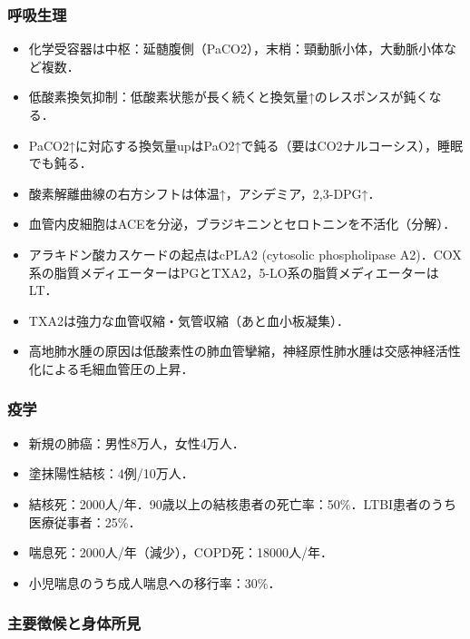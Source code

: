 \subsubsection{呼吸生理}

\begin{itemize}
\item 化学受容器は中枢：延髄腹側（PaCO2），末梢：頸動脈小体，大動脈小体など複数．
\item 低酸素換気抑制：低酸素状態が長く続くと換気量↑のレスポンスが鈍くなる．
\item PaCO2↑に対応する換気量upはPaO2↑で鈍る（要はCO2ナルコーシス），睡眠でも鈍る．
\item 酸素解離曲線の右方シフトは体温↑，アシデミア，2,3-DPG↑．
\item 血管内皮細胞はACEを分泌，ブラジキニンとセロトニンを不活化（分解）．
\item アラキドン酸カスケードの起点はcPLA2 (cytosolic phospholipase A2)．COX系の脂質メディエーターはPGとTXA2，5-LO系の脂質メディエーターはLT．
\item TXA2は強力な血管収縮・気管収縮（あと血小板凝集）．
\item 高地肺水腫の原因は低酸素性の肺血管攣縮，神経原性肺水腫は交感神経活性化による毛細血管圧の上昇．
\end{itemize}


\subsubsection{疫学}

\begin{itemize}
\item 新規の肺癌：男性8万人，女性4万人．
\item 塗抹陽性結核：4例/10万人．
\item 結核死：2000人/年．90歳以上の結核患者の死亡率：50\%．LTBI患者のうち医療従事者：25\%．
\item 喘息死：2000人/年（減少），COPD死：18000人/年．
\item 小児喘息のうち成人喘息への移行率：30\%．
\end{itemize}


\subsubsection{主要徴候と身体所見}

